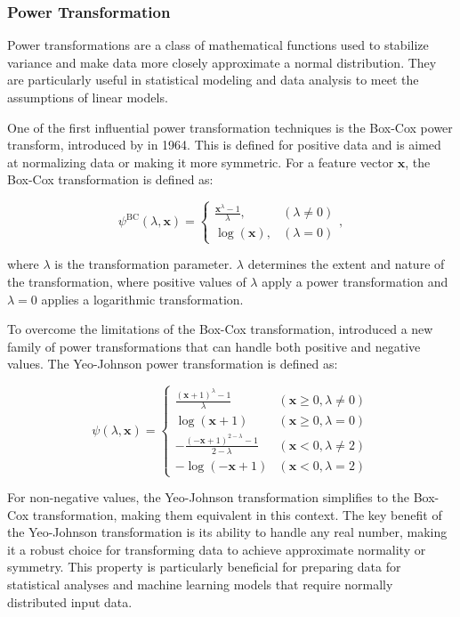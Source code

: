 \subsubsection{Power Transformation}
Power transformations are a class of mathematical functions used to stabilize variance and make data more closely approximate a normal distribution.
They are particularly useful in statistical modeling and data analysis to meet the assumptions of linear models.

One of the first influential power transformation techniques is the Box-Cox power transform, introduced by \citet{BoxAndCox} in 1964.
This is defined for positive data and is aimed at normalizing data or making it more symmetric.
For a feature vector $\mathbf{x}$, the Box-Cox transformation is defined as:

$$
\psi^{\text{BC}}(\lambda, \mathbf{x}) =
\begin{cases}
\frac{\mathbf{x}^\lambda - 1}{\lambda}, & (\lambda \neq 0) \\
\log(\mathbf{x}), & (\lambda = 0)
\end{cases},
$$

where $\lambda$ is the transformation parameter.
$\lambda$ determines the extent and nature of the transformation, where positive values of $\lambda$ apply a power transformation and $\lambda = 0$ applies a logarithmic transformation.

To overcome the limitations of the Box-Cox transformation, \citet{YeoJohnson} introduced a new family of power transformations that can handle both positive and negative values.
The Yeo-Johnson power transformation is defined as:

$$
\psi(\lambda, \mathbf{x}) =
\begin{cases}
\frac{(\mathbf{x} + 1)^\lambda - 1}{\lambda} & (\mathbf{x} \geq 0, \lambda \neq 0) \\
\log(\mathbf{x} + 1) & (\mathbf{x} \geq 0, \lambda = 0) \\
- \frac{(-\mathbf{x} + 1)^{2 - \lambda} - 1}{2 - \lambda} & (\mathbf{x} < 0, \lambda \neq 2) \\
-\log(-\mathbf{x} + 1) & (\mathbf{x} < 0, \lambda = 2)
\end{cases}
$$

For non-negative values, the Yeo-Johnson transformation simplifies to the Box-Cox transformation, making them equivalent in this context.
The key benefit of the Yeo-Johnson transformation is its ability to handle any real number, making it a robust choice for transforming data to achieve approximate normality or symmetry.
This property is particularly beneficial for preparing data for statistical analyses and machine learning models that require normally distributed input data.